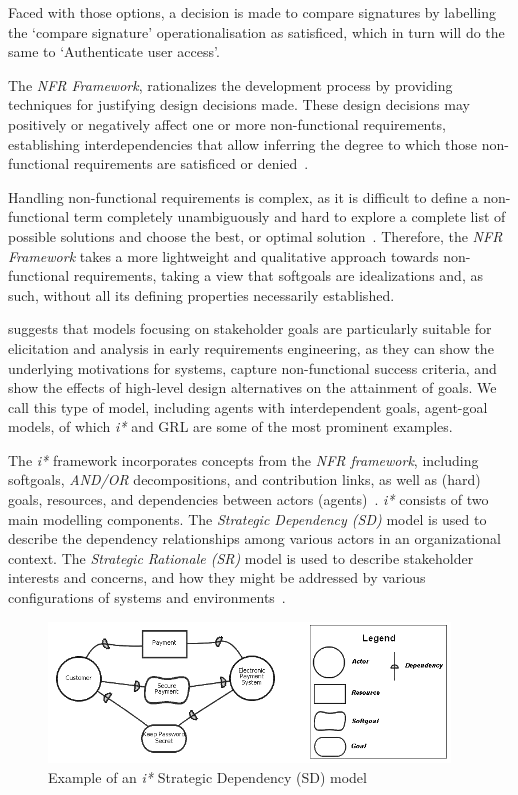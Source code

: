 \documentclass[dissertation,final]{softeng}
\begin{document}
{Faced with those options, a decision is made to compare signatures by labelling the `compare signature' operationalisation as satisficed, which in turn will do the same to `Authenticate user access'.

The \emph{NFR Framework}, rationalizes the development process by providing techniques for justifying design decisions made. These design decisions may positively or negatively affect one or more non-functional requirements, establishing interdependencies that allow inferring the degree to which those non-functional requirements are satisficed or denied~\citep{Chung2000}.

Handling non-functional requirements is complex, as it is difficult to define a non-functional term completely unambiguously and hard to explore a complete list of possible solutions and choose the best, or optimal solution~\citep{Chung:2009vg}. Therefore, the \emph{NFR Framework} takes a more lightweight and qualitative approach towards non-functional requirements, taking a view that softgoals are idealizations and, as such, without all its defining properties necessarily established.

\citet{Horkoff2012} suggests that models focusing on stakeholder goals are particularly suitable for elicitation and analysis in early requirements engineering, as they can show the underlying motivations for systems, capture non-functional success criteria, and show the effects of high-level design alternatives on the attainment of goals. We call this type of model, including agents with interdependent goals, agent-goal models, of which \emph{i*} and GRL are some of the most prominent examples.

The \emph{i*} framework incorporates concepts from the \emph{NFR framework}, including softgoals, \emph{AND/OR} decompositions, and contribution links, as well as (hard) goals, resources, and dependencies between actors (agents)~\citep{Horkoff2013}. \emph{i*} consists of two main modelling components. The \emph{Strategic Dependency (SD)} model is used to describe the dependency relationships among various actors in an organizational context. The \emph{Strategic Rationale (SR)} model is used to describe stakeholder interests and concerns, and how they might be addressed by various configurations of systems and environments~\citep{Yu1997}.

\begin{figure}[h]
\includegraphics[width=0.95\textwidth]{istar_example}
\centering
\caption[Example of an \emph{i*} Strategic Dependency (SD) model]{Example of an \emph{i*} Strategic Dependency (SD) model~\citep{Roy:2007wyba}}
\label{fig:istar_example}
\end{figure}

}
\end{document}
